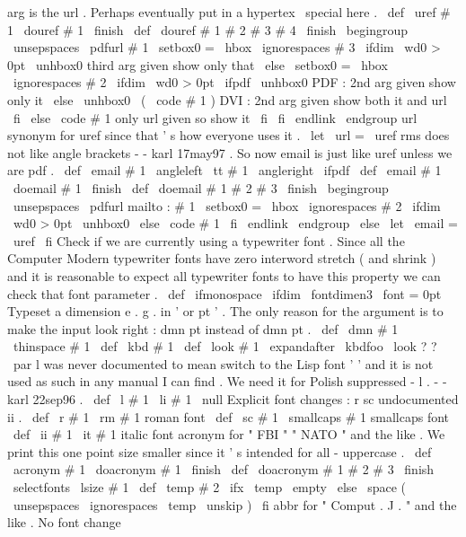 {arg
is
the
url
.
Perhaps
eventually
put
in
%
a
hypertex
\
special
here
.
%
\
def
\
uref
#
1
{
\
douref
#
1
\
finish
}
\
def
\
douref
#
1
#
2
#
3
#
4
\
finish
{
\
begingroup
\
unsepspaces
\
pdfurl
{
#
1
}
%
\
setbox0
=
\
hbox
{
\
ignorespaces
#
3
}
%
\
ifdim
\
wd0
>
0pt
\
unhbox0
%
third
arg
given
show
only
that
\
else
\
setbox0
=
\
hbox
{
\
ignorespaces
#
2
}
%
\
ifdim
\
wd0
>
0pt
\
ifpdf
\
unhbox0
%
PDF
:
2nd
arg
given
show
only
it
\
else
\
unhbox0
\
(
\
code
{
#
1
}
)
%
DVI
:
2nd
arg
given
show
both
it
and
url
\
fi
\
else
\
code
{
#
1
}
%
only
url
given
so
show
it
\
fi
\
fi
\
endlink
\
endgroup
}
%
url
synonym
for
uref
since
that
'
s
how
everyone
uses
it
.
%
\
let
\
url
=
\
uref
%
rms
does
not
like
angle
brackets
-
-
karl
17may97
.
%
So
now
email
is
just
like
uref
unless
we
are
pdf
.
%
%
\
def
\
email
#
1
{
\
angleleft
{
\
tt
#
1
}
\
angleright
}
\
ifpdf
\
def
\
email
#
1
{
\
doemail
#
1
\
finish
}
\
def
\
doemail
#
1
#
2
#
3
\
finish
{
\
begingroup
\
unsepspaces
\
pdfurl
{
mailto
:
#
1
}
%
\
setbox0
=
\
hbox
{
\
ignorespaces
#
2
}
%
\
ifdim
\
wd0
>
0pt
\
unhbox0
\
else
\
code
{
#
1
}
\
fi
\
endlink
\
endgroup
}
\
else
\
let
\
email
=
\
uref
\
fi
%
Check
if
we
are
currently
using
a
typewriter
font
.
Since
all
the
%
Computer
Modern
typewriter
fonts
have
zero
interword
stretch
(
and
%
shrink
)
and
it
is
reasonable
to
expect
all
typewriter
fonts
to
have
%
this
property
we
can
check
that
font
parameter
.
%
\
def
\
ifmonospace
{
\
ifdim
\
fontdimen3
\
font
=
0pt
}
%
Typeset
a
dimension
e
.
g
.
in
'
or
pt
'
.
The
only
reason
for
the
%
argument
is
to
make
the
input
look
right
:
dmn
{
pt
}
instead
of
dmn
{
}
pt
.
%
\
def
\
dmn
#
1
{
\
thinspace
#
1
}
\
def
\
kbd
#
1
{
\
def
\
look
{
#
1
}
\
expandafter
\
kbdfoo
\
look
?
?
\
par
}
%
l
was
never
documented
to
mean
switch
to
the
Lisp
font
'
'
%
and
it
is
not
used
as
such
in
any
manual
I
can
find
.
We
need
it
for
%
Polish
suppressed
-
l
.
-
-
karl
22sep96
.
%
\
def
\
l
#
1
{
{
\
li
#
1
}
\
null
}
%
Explicit
font
changes
:
r
sc
undocumented
ii
.
\
def
\
r
#
1
{
{
\
rm
#
1
}
}
%
roman
font
\
def
\
sc
#
1
{
{
\
smallcaps
#
1
}
}
%
smallcaps
font
\
def
\
ii
#
1
{
{
\
it
#
1
}
}
%
italic
font
%
acronym
for
"
FBI
"
"
NATO
"
and
the
like
.
%
We
print
this
one
point
size
smaller
since
it
'
s
intended
for
%
all
-
uppercase
.
%
\
def
\
acronym
#
1
{
\
doacronym
#
1
\
finish
}
\
def
\
doacronym
#
1
#
2
#
3
\
finish
{
%
{
\
selectfonts
\
lsize
#
1
}
%
\
def
\
temp
{
#
2
}
%
\
ifx
\
temp
\
empty
\
else
\
space
(
{
\
unsepspaces
\
ignorespaces
\
temp
\
unskip
}
)
%
\
fi
}
%
abbr
for
"
Comput
.
J
.
"
and
the
like
.
%
No
font
change
}
